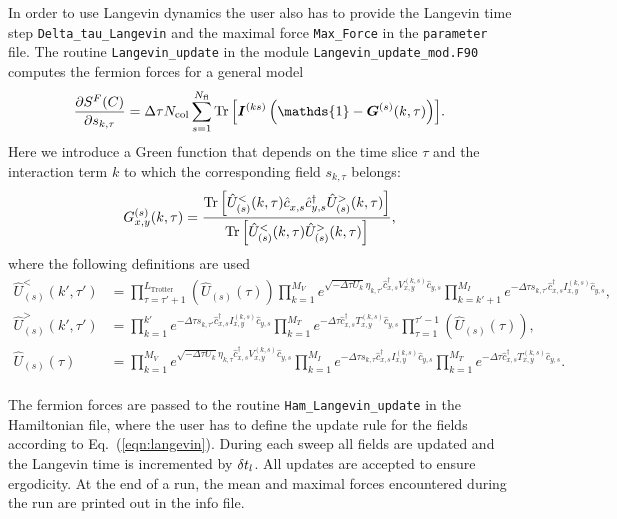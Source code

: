 In order to use Langevin dynamics the user also has to provide the Langevin time step \texttt{Delta\_tau\_Langevin} and the maximal force \texttt{Max\_Force} in the \texttt{parameter} file. The routine  \texttt{Langevin\_update} in the module \texttt{Langevin\_update\_mod.F90}   computes the fermion forces  for a  general model
\begin{equation}
 \frac { \partial S^F(C)}{\partial s_{k,\tau} } 
 	= \Delta \tau {N_{\mathrm{col}}} \sum\limits_{s=1}^{N_{\mathrm{fl}}} \Tr{\left[ \bm{I}^{(ks)}\left(\mathds{1} - \bm{G}^{(s)}(k,\tau) \right) \right]} .
\end{equation}
Here we introduce a Green function that depends on the time slice $\tau$  and the interaction term $k$ to which the corresponding field $s_{k,\tau}$ belongs:
\begin{equation}
G_{x,y}^{(s)}(k,\tau) = \frac{\Tr{\left[ \hat{U}_{(s)}^{<}(k,\tau) \hat{c}_{x,s}^{\phantom\dagger} \hat{c}_{y,s}^{\dagger} \hat{U}_{(s)}^{>}(k,\tau) \right]} }
{\Tr{\left[ \hat{U}_{(s)}^{<}(k,\tau)\hat{U}_{(s)}^{>}(k,\tau) \right]}},
\end{equation}
where the following definitions are used
\begin{align}
 \hat{U}_{(s)}^{<}(k',\tau') &= \prod_{\tau=\tau'+1}^{L_{\text{Trotter}}}  \left( \hat{U}_{(s)}(\tau) \right)
  \prod_{k=1}^{M_V} e^{\sqrt{-\Delta\tau U_k}  \eta_{k,\tau'} \hat{c}_{x,s}^{\dagger} V_{x,y}^{(k,s)} \hat{c}_{y,s}^{\phantom\dagger}}
\prod_{k=k'+1}^{M_I} e^{-\Delta\tau s_{k,\tau'} \hat{c}_{x,s}^{\dagger} I_{x,y}^{(k,s)} \hat{c}_{y,s}^{\phantom\dagger}}, \\
 \hat{U}_{(s)}^{>}(k',\tau') &= \prod_{k=1}^{k'} e^{-\Delta \tau s_{k,\tau'}  \hat{c}_{x,s}^{\dagger} I_{x,y}^{(k,s)} \hat{c}_{y,s}^{\phantom\dagger}}
  \prod_{k=1}^{M_T}   e^{-\Delta\tau  \hat{c}_{x,s}^{\dagger} T_{x,y}^{(k,s)} \hat{c}_{y,s}^{\phantom\dagger}} 
  \prod_{\tau=1}^{\tau'-1}  \left( \hat{U}_{(s)}(\tau) \right), \\
  \hat{U}_{(s)}(\tau) &= \prod_{k=1}^{M_V} e^{\sqrt{-\Delta\tau U_k}  \eta_{k,\tau} \hat{c}_{x,s}^{\dagger} V_{x,y}^{(k,s)} \hat{c}_{y,s}^{\phantom\dagger}} 
  \prod_{k=1}^{M_I} e^{-\Delta\tau s_{k,\tau} \hat{c}_{x,s}^{\dagger} I_{x,y}^{(k,s)} \hat{c}_{y,s}^{\phantom\dagger}}
    \prod_{k=1}^{M_T}   e^{-\Delta\tau  \hat{c}_{x,s}^{\dagger} T_{x,y}^{(k,s)} \hat{c}_{y,s}^{\phantom\dagger}} .
\end{align}
\\
The fermion forces are passed to the routine \texttt{Ham\_Langevin\_update} in the Hamiltonian file, where the user has to define the update rule for the fields according to Eq.~(\ref{eqn:langevin}). During each sweep all fields are updated and the Langevin time is incremented by $\delta t_{l}$. All updates are accepted to ensure ergodicity. At the end of a run, the mean and maximal forces encountered during the run are printed out in the info file. 

